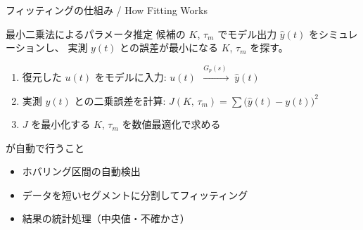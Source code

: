 \documentclass[aspectratio=169, 14pt]{beamer}
\begin{document}
\begin{frame}{フィッティングの仕組み / How Fitting Works}
  \begin{block}{最小二乗法によるパラメータ推定}
    {\small
    候補の $K$, $\tau_m$ でモデル出力 $\hat{y}(t)$ をシミュレーションし、
    実測 $y(t)$ との誤差が最小になる $K$, $\tau_m$ を探す。
    }
  \end{block}

  \vspace{0.3em}

  {\footnotesize
  \begin{enumerate}\setlength{\itemsep}{2pt}
    \item 復元した $u(t)$ をモデルに入力:
          \quad $u(t) \;\xrightarrow{\;G_p(s)\;}\; \hat{y}(t)$
    \item 実測 $y(t)$ との二乗誤差を計算:
          \quad $J(K,\,\tau_m) = \sum \bigl(\hat{y}(t) - y(t)\bigr)^2$
    \item $J$ を最小化する $K$, $\tau_m$ を数値最適化で求める
  \end{enumerate}
  }

  \vspace{0.3em}

  \begin{exampleblock}{ が自動で行うこと}
    {\footnotesize
    \begin{itemize}\setlength{\itemsep}{0pt}
      \item ホバリング区間の自動検出
      \item データを短いセグメントに分割してフィッティング
      \item 結果の統計処理（中央値・不確かさ）
    \end{itemize}
    }
  \end{exampleblock}
\end{frame}
\end{document}
